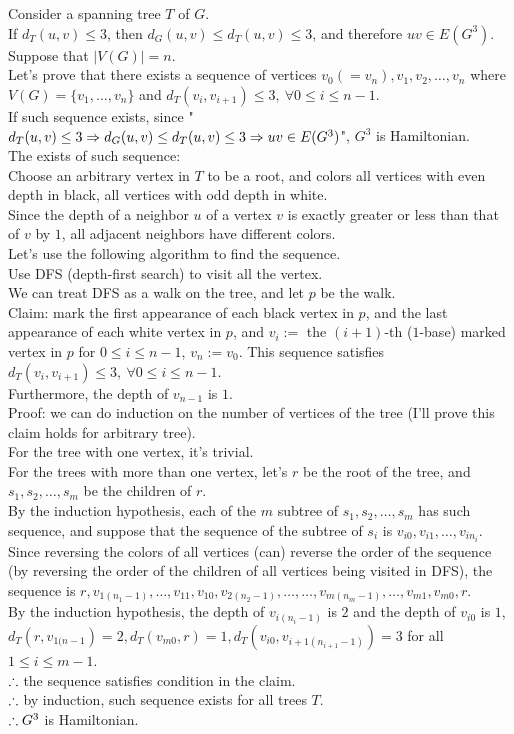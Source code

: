 \setcounter{pr}{5}
\begin{pr}
Consider a spanning tree $T$ of $G$.\\
If $d_T(u, v)\leq3$, then $d_G(u, v)\leq d_T(u, v)\leq3$, and therefore $uv\in E(G^3)$.\\
Suppose that $|V(G)|=n$.\\
Let's prove that there exists a sequence of vertices $v_0(=v_n), v_1, v_2, \dots, v_n$ where $V(G)=\{v_1, \dots, v_n\}$ and $d_T(v_i, v_{i+1})\leq3,\ \forall0\leq i\leq n-1$.\\
If such sequence exists, since "$d_T(u, v)\leq3\Rightarrow d_G(u, v)\leq d_T(u, v)\leq3\Rightarrow uv\in E(G^3)$", $G^3$ is Hamiltonian.\\
The exists of such sequence:\\
Choose an arbitrary vertex in $T$ to be a root, and colors all vertices with even depth in black, all vertices with odd depth in white.\\
Since the depth of a neighbor $u$ of a vertex $v$ is exactly greater or less than that of $v$ by $1$, all adjacent neighbors have different colors.\\
Let's use the following algorithm to find the sequence.\\
Use DFS (depth-first search) to visit all the vertex.\\
We can treat DFS as a walk on the tree, and let $p$ be the walk.\\
Claim: mark the first appearance of each black vertex in $p$, and the last appearance of each white vertex in $p$, and $v_i:=$ the $(i+1)$-th ($1$-base) marked vertex in $p$ for $0\leq i\leq n-1$, $v_n:=v_0$. This sequence satisfies $d_T(v_i, v_{i+1})\leq3,\ \forall0\leq i\leq n-1$.\\ Furthermore, the depth of $v_{n-1}$ is $1$.\\
Proof: we can do induction on the number of vertices of the tree (I'll prove this claim holds for arbitrary tree).\\
For the tree with one vertex, it's trivial.\\
For the trees with more than one vertex, let's $r$ be the root of the tree, and $s_1, s_2, \dots, s_m$ be the children of $r$.\\
By the induction hypothesis, each of the $m$ subtree of $s_1, s_2, \dots, s_m$ has such sequence, and suppose that the sequence of the subtree of $s_i$ is $v_{i0}, v_{i1}, \dots, v_{in_i}$.\\
Since reversing the colors of all vertices (can) reverse the order of the sequence (by reversing the order of the children of all vertices being visited in DFS), the sequence is $r, v_{1(n_1-1)}, \dots, v_{11}, v_{10}, v_{2(n_2-1)}, \dots, \dots, v_{m(n_m-1)}, \dots, v_{m1}, v_{m0}, r$.\\
By the induction hypothesis, the depth of $v_{i(n_i-1)}$ is $2$ and the depth of $v_{i0}$ is $1$, $d_T(r, v_{1(n-1})=2, d_T(v_{m0}, r)=1, d_T(v_{i0}, v_{{i+1}(n_{i+1}-1)})=3$ for all $1\leq i\leq m-1$.\\
$\therefore$ the sequence satisfies condition in the claim.\\
$\therefore$ by induction, such sequence exists for all trees $T$.\\
$\therefore G^3$ is Hamiltonian.
\end{pr}
